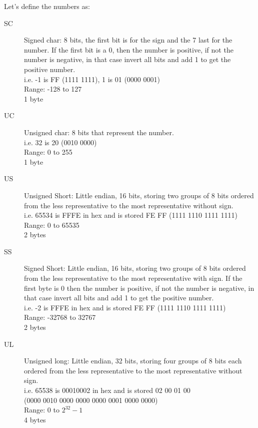 \documentclass{article}
\begin{document}
 Let's define the numbers as:
\begin{description}
\item[SC]{ Signed char: 8 bits, the first bit is for the sign and the 7 last
       for the number. If the first bit is a 0, then the number is
       positive, if not the number is negative, in that case invert all
       bits and add 1 to get the positive number.\\
       i.e. -1 is FF (1111 1111), 1 is 01 (0000 0001)\\
       Range: -128 to 127\\
       1 byte}
\item[UC]{Unsigned char: 8 bits that represent the number.\\
       i.e. 32 is 20 (0010 0000)\\
       Range: 0 to 255\\
       1 byte}
\item[US]{Unsigned Short:  Little endian, 16 bits, storing two groups of 8 bits
       ordered from the less representative to the most representative
       without sign.\\
       i.e. 65534 is FFFE in hex and is stored FE FF (1111 1110  1111 1111)\\
       Range: 0 to 65535\\
       2 bytes}
\item[SS]{Signed Short: Little endian, 16 bits, storing two groups of 8 bits
       ordered from the less representative to the most representative with
       sign. If the first byte is 0 then the number is positive, if not the
       number is negative, in that case invert all bits and add 1 to get
       the positive number.\\
       i.e. -2 is FFFE in hex and is stored FE FF (1111 1110  1111 1111)\\
       Range: -32768 to 32767\\
       2 bytes}
\item[UL]{Unsigned long: Little endian, 32 bits, storing four groups of 8 bits
       each ordered from the less representative to the most representative
       without sign.\\
       i.e. 65538 is 00010002 in hex and is stored 02 00 01 00\\
       (0000 0010  0000 0000  0000 0001  0000 0000)\\
       Range: $0$ to $2^{32}-1$\\
       4 bytes}

\end{description}
\end{document}
